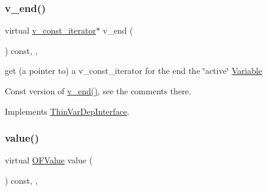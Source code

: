 \subsubsection{\texorpdfstring{v\+\_\+end()}{v\_end()}\hspace{0.1cm}{\footnotesize\ttfamily [2/2]}}
{\footnotesize\ttfamily virtual \mbox{\hyperlink{class_s_m_spp__di__unipi__it_1_1_thin_var_dep_interface_1_1v__const__iterator}{v\+\_\+const\+\_\+iterator}}$\ast$ v\+\_\+end (\begin{DoxyParamCaption}\item[{void}]{ }\end{DoxyParamCaption}) const\hspace{0.3cm}{\ttfamily [inline]}, {\ttfamily [override]}, {\ttfamily [virtual]}}



get (a pointer to) a v\+\_\+const\+\_\+iterator for the end the \char`\"{}active\char`\"{} \mbox{\hyperlink{class_s_m_spp__di__unipi__it_1_1_variable}{Variable}} 

Const version of \mbox{\hyperlink{class_s_m_spp__di__unipi__it_1_1_f_real_objective_ad17303c6335cb94a9d32f1fce77501fd}{v\+\_\+end()}}, see the comments there. 

Implements \mbox{\hyperlink{group___thin_var_dep_interface___c_l_a_s_s_e_s_ga6c504e866663eb64b230179f81370af4}{Thin\+Var\+Dep\+Interface}}.

\mbox{\label{class_s_m_spp__di__unipi__it_1_1_f_real_objective_a5733803d5bd031be89b835e0bfe3b9c2}} 
\subsubsection{\texorpdfstring{value()}{value()}}
{\footnotesize\ttfamily virtual \mbox{\hyperlink{class_s_m_spp__di__unipi__it_1_1_real_objective_ab8ce6bff9c21fdcd41e355167209301a}{O\+F\+Value}} value (\begin{DoxyParamCaption}\item[{void}]{ }\end{DoxyParamCaption}) const\hspace{0.3cm}{\ttfamily [inline]}, {\ttfamily [override]}, {\ttfamily [virtual]}}



